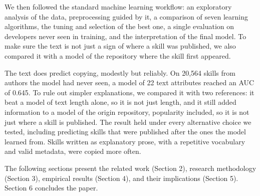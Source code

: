 We then followed the standard machine learning workflow: an exploratory
analysis of the data, preprocessing guided by it, a comparison of seven
learning algorithms, the tuning and selection of the best one, a single
evaluation on developers never seen in training, and the interpretation
of the final model. To make sure the text is not just a sign of where a
skill was published, we also compared it with a model of the repository
where the skill first appeared.

The text does predict copying, modestly but reliably. On 20,564 skills
from authors the model had never seen, a model of 22 text attributes
reached an AUC of 0.645. To rule out simpler explanations, we compared
it with two references: it beat a model of text length alone, so it is
not just length, and it still added information to a model of the origin
repository, popularity included, so it is not just where a skill is
published. The result held under every alternative choice we tested,
including predicting skills that were published after the ones the model
learned from. Skills written as explanatory prose, with a repetitive
vocabulary and valid metadata, were copied more often.

The following sections present the related work (Section 2), research
methodology (Section 3), empirical results (Section 4), and their
implications (Section 5). Section 6 concludes the paper.
